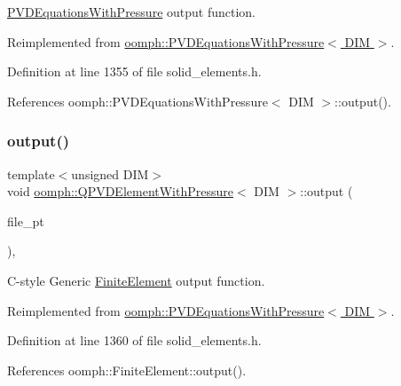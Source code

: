 \hyperlink{classoomph_1_1PVDEquationsWithPressure}{P\+V\+D\+Equations\+With\+Pressure} output function. 



Reimplemented from \hyperlink{classoomph_1_1PVDEquationsWithPressure_a3522de42dcebba5f7531c5913857303d}{oomph\+::\+P\+V\+D\+Equations\+With\+Pressure$<$ D\+I\+M $>$}.



Definition at line 1355 of file solid\+\_\+elements.\+h.



References oomph\+::\+P\+V\+D\+Equations\+With\+Pressure$<$ D\+I\+M $>$\+::output().

\mbox{\label{classoomph_1_1QPVDElementWithPressure_adf19767f05bb8227c56b011c3f6931e5}} 
\subsubsection{\texorpdfstring{output()}{output()}\hspace{0.1cm}{\footnotesize\ttfamily [3/4]}}
{\footnotesize\ttfamily template$<$unsigned D\+IM$>$ \\
void \hyperlink{classoomph_1_1QPVDElementWithPressure}{oomph\+::\+Q\+P\+V\+D\+Element\+With\+Pressure}$<$ D\+IM $>$\+::output (\begin{DoxyParamCaption}\item[{F\+I\+LE $\ast$}]{file\+\_\+pt }\end{DoxyParamCaption})\hspace{0.3cm}{\ttfamily [inline]}, {\ttfamily [virtual]}}



C-\/style Generic \hyperlink{classoomph_1_1FiniteElement}{Finite\+Element} output function. 



Reimplemented from \hyperlink{classoomph_1_1PVDEquationsWithPressure_ae6d9a646cfd9be12134aeba45249d7c7}{oomph\+::\+P\+V\+D\+Equations\+With\+Pressure$<$ D\+I\+M $>$}.



Definition at line 1360 of file solid\+\_\+elements.\+h.



References oomph\+::\+Finite\+Element\+::output().

